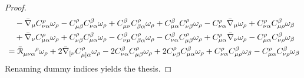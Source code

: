 \begin{proofbox}
\begin{proof}
\begin{equation*}
\begin{split}
        & \quad - \bar{\na}_\mu C^\rho_{\nu \alpha} \omega_\rho - C^\rho_{\mu \beta} C^\beta_{\nu \alpha} \omega_\rho + C^\beta_{\mu \nu} C^\rho_{\beta \alpha} \omega_\rho + C^\beta_{\mu \alpha} C^\rho_{\nu \beta} \omega_\rho - C^\rho_{\nu \alpha} \bar{\na}_\mu \omega_\rho + C^\rho_{\nu \alpha} C^\beta_{\mu \rho} \omega_\beta \\
        & \quad + \bar{\na}_\nu C^\rho_{\mu \alpha} \omega_\rho + C^\rho_{\nu \beta} C^\beta_{\mu \alpha} \omega_\rho - C^\beta_{\nu \mu} C^\rho_{\beta \alpha} \omega_\rho - C^\beta_{\nu \alpha} C^\rho_{\mu \beta} \omega_\rho + C^\rho_{\mu \alpha} \bar{\na}_\nu \omega_\rho - C^\rho_{\mu \alpha} C^\beta_{\nu \rho} \omega_\beta \\
        & = \tensor{\bar{\rr}}{_{\mu \nu \alpha}^\rho} \omega_\rho + 2 \bar{\na}_{[\nu} C^\rho_{\mu]\alpha} \omega_\rho - 2 C^\beta_{\nu \alpha} C^\rho_{\mu \beta} \omega_\rho + 2 C^\rho_{\nu \beta} C^\beta_{\mu \alpha} \omega_\rho + C^\rho_{\nu \alpha} C^\beta_{\mu \rho} \omega_\beta - C^\rho_{\mu \alpha} C^\beta_{\nu \rho} \omega_\beta
      \end{split}
    \end{equation*}
    Renaming dummy indices yields the thesis.
  \end{proof}
\end{proofbox}

